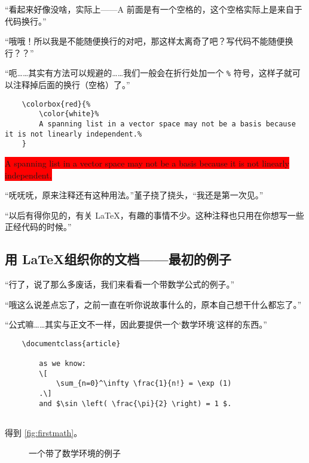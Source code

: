 “看起来好像没啥，实际上——A 前面是有一个空格的，这个空格实际上是来自于代码换行。”

“哦哦！所以我是不能随便换行的对吧，那这样太离奇了吧？写代码不能随便换行？？”

“呃……其实有方法可以规避的……我们一般会在折行处加一个 \verb"%" 符号，这样子就可以注释掉后面的换行（空格）了。”


\begin{lstlisting}
    \colorbox{red}{%
        \color{white}%
        A spanning list in a vector space may not be a basis because it is not linearly independent.%
    }
\end{lstlisting}

\begin{center}\footnotesize
    \colorbox{red}{%
        \color{white}%
        A spanning list in a vector space may not be a basis because it is not linearly independent.%
    }
\end{center}

“呒呒呒，原来注释还有这种用法。”堇子挠了挠头，“我还是第一次见。”

“以后有得你见的，有关 \LaTeX，有趣的事情不少。这种注释也只用在你想写一些正经代码的时候。”

\subsection{用 \LaTeX 组织你的文档——最初的例子}

“行了，说了那么多废话，我们来看看一个带数学公式的例子。”

“哦这么说差点忘了，之前一直在听你说故事什么的，原本自己想干什么都忘了。”

“公式嘛……其实与正文不一样，因此要提供一个‘数学环境’这样的东西。”


\begin{lstlisting}
    \documentclass{article}
    
        as we know:
        \[
            \sum_{n=0}^\infty \frac{1}{n!} = \exp (1)
        .\]
        and $\sin \left( \frac{\pi}{2} \right) = 1 $.
    
\end{lstlisting}

得到 \autoref{fig:firstmath}。

\begin{figure}[th]
    \centering
    \caption{一个带了数学环境的例子}
    \label{fig:firstmath}
\end{figure}


